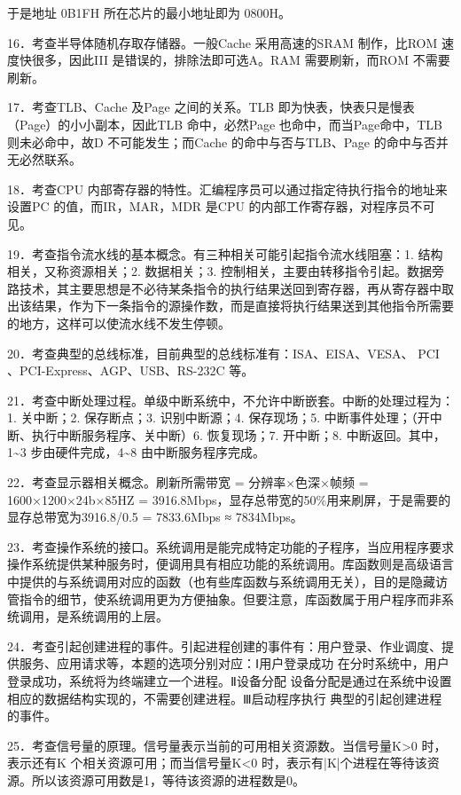 \documentclass[UTF8,11pt]{ctexart}
\begin{document}
于是地址 0B1FH 所在芯片的最小地址即为 0800H。


16．考查半导体随机存取存储器。一般Cache 采用高速的SRAM 制作，比ROM 速度快很多，因此III 是错误的，排除法即可选A。RAM 需要刷新，而ROM 不需要刷新。


17．考查TLB、Cache 及Page 之间的关系。TLB 即为快表，快表只是慢表（Page）的小小副本，因此TLB 命中，必然Page 也命中，而当Page命中，TLB 则未必命中，故D 不可能发生；而Cache 的命中与否与TLB、Page 的命中与否并无必然联系。


18．考查CPU 内部寄存器的特性。汇编程序员可以通过指定待执行指令的地址来设置PC 的值，而IR，MAR，MDR 是CPU 的内部工作寄存器，对程序员不可见。


19．考查指令流水线的基本概念。有三种相关可能引起指令流水线阻塞：1. 结构相关，又称资源相关；2. 数据相关；3. 控制相关，主要由转移指令引起。数据旁路技术，其主要思想是不必待某条指令的执行结果送回到寄存器，再从寄存器中取出该结果，作为下一条指令的源操作数，而是直接将执行结果送到其他指令所需要的地方，这样可以使流水线不发生停顿。


20．考查典型的总线标准，目前典型的总线标准有：ISA、EISA、VESA、 PCI 、PCI-Express、AGP、USB、RS-232C 等。


21．考查中断处理过程。单级中断系统中，不允许中断嵌套。中断的处理过程为：1. 关中断；2. 保存断点；3. 识别中断源；4. 保存现场；5. 中断事件处理；（开中断、执行中断服务程序、关中断）6. 恢复现场；7. 开中断；8. 中断返回。其中，1\textasciitilde{}3 步由硬件完成，4\textasciitilde{}8 由中断服务程序完成。


22．考查显示器相关概念。刷新所需带宽 = 分辨率×色深×帧频 = 1600×1200×24b×85HZ = 3916.8Mbps，显存总带宽的50\%用来刷屏，于是需要的显存总带宽为3916.8/0.5 = 7833.6Mbps ≈ 7834Mbps。


23．考查操作系统的接口。系统调用是能完成特定功能的子程序，当应用程序要求操作系统提供某种服务时，便调用具有相应功能的系统调用。库函数则是高级语言中提供的与系统调用对应的函数（也有些库函数与系统调用无关），目的是隐藏访管指令的细节，使系统调用更为方便抽象。但要注意，库函数属于用户程序而非系统调用，是系统调用的上层。


24．考查引起创建进程的事件。引起进程创建的事件有：用户登录、作业调度、提供服务、应用请求等，本题的选项分别对应：Ⅰ用户登录成功 在分时系统中，用户登录成功，系统将为终端建立一个进程。Ⅱ设备分配 设备分配是通过在系统中设置相应的数据结构实现的，不需要创建进程。Ⅲ启动程序执行 典型的引起创建进程的事件。


25．考查信号量的原理。信号量表示当前的可用相关资源数。当信号量K>0 时，表示还有K 个相关资源可用；而当信号量K<0 时，表示有|K|个进程在等待该资源。所以该资源可用数是1，等待该资源的进程数是0。
\end{document}
